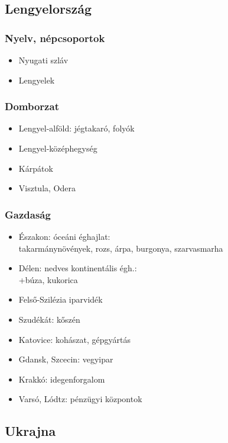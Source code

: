 \documentclass{article}
\begin{document}
\subsection{Lengyelország}
\subsubsection{Nyelv, népcsoportok}

\begin{itemize}
    \item Nyugati szláv
    \item Lengyelek
\end{itemize}

\subsubsection{Domborzat}

\begin{itemize}
    \item Lengyel-alföld: jégtakaró, folyók
    \item Lengyel-középhegység
    \item Kárpátok
    \item Visztula, Odera
\end{itemize}

\subsubsection{Gazdaság}

\begin{itemize}
    \item Északon: óceáni éghajlat: \\
    takarmánynövények, rozs, árpa, burgonya, szarvasmarha
    \item Délen: nedves kontinentális égh.: \\
    +búza, kukorica
    \item Felső-Szilézia iparvidék
    \item Szudékát: kőszén
    \item Katovice: kohászat, gépgyártás
    \item Gdansk, Szcecin: vegyipar
    \item Krakkó: idegenforgalom
    \item Varsó, Lódtz: pénzügyi központok
\end{itemize}

\subsection{Ukrajna}
\end{document}
